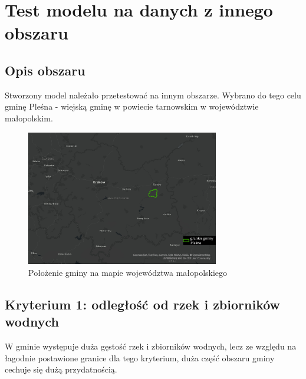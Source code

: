 \documentclass{article}
\begin{document}
\section{Test modelu na danych z innego obszaru}
\subsection{Opis obszaru}
Stworzony model należało przetestować na innym obszarze. Wybrano do tego celu gminę Pleśna - wiejską gminę w powiecie tarnowskim w województwie małopolskim.

\begin{figure}[H]
    \centering
    \includegraphics[width=0.75\textwidth]{img/plesna-polozenie.jpg}
    \caption{Położenie gminy na mapie województwa małopolskiego}
\end{figure}

\subsection{Kryterium 1: odległość od rzek i zbiorników wodnych}
W gminie występuje duża gęstość rzek i zbiorników wodnych, lecz ze względu na łagodnie postawione granice dla tego kryterium, duża część obszaru gminy cechuje się dużą przydatnością.
\end{document}
